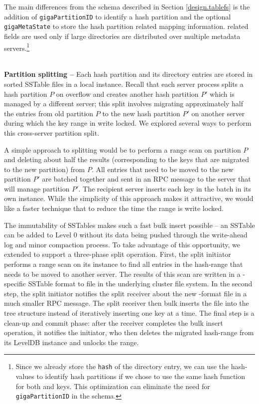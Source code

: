 The main differences from the \ldb{} schema described in Section
\ref{design.tablefs} is the addition of \texttt{gigaPartitionID} to identify a
\giga{} hash partition and the optional \texttt{gigaMetaState} to store the
hash partition related mapping information. \giga{} related fields are used
only if large directories are distributed over multiple metadata servers.\footnote{
Since we already store the \texttt{hash} of the directory entry, we can use the
hash-values to identify hash partitions if we chose to use the same hash
function for both \giga and \ldb keys. This optimization can eliminate the
need for \texttt{gigaPartitionID} in the schema.} 

~\\
\textbf{Partition splitting -- }
Each \giga{} hash partition and its directory entries are stored in sorted
SSTable files in a local \ldb{} instance. 
Recall that each \giga{} server process splits a hash partition $P$ on 
overflow and creates another hash partition $P'$ which is managed by a 
different server; this split involves migrating approximately half the entries 
from old partition $P$ to the new hash partition $P'$ on another server during
which the key range in write locked.
We explored several ways to perform this cross-server partition split.

A simple approach to splitting would be to perform a \ldb range scan on 
partition $P$ and deleting about half the results (corresponding to the keys
that are migrated to the new partition) from $P$. 
All entries that need to be moved to the new partition $P'$ are batched
together and sent in an RPC message to the server that will manage partition 
$P'$.
The recipient server inserts each key in the batch in its own \ldb{}
instance. While the simplicity of this approach makes it attractive, we would
like a faster technique that to reduce the time the range is write locked. 

The immutability of \ldb SSTables makes such a fast bulk insert possible -- an
SSTable can be added to Level 0 without its data being pushed through the
write-ahead log and minor compaction process.
To take advantage of this opportunity, we extended \ldb{}
to support a three-phase split operation. 
First, the split initiator performs a range scan on its \ldb{} instance to find all
entries in the hash-range that needs to be moved to another server. The results
of this scan are written in a \ldb{}-specific SSTable format to file in the
underlying cluster file system. 
In the second step, the split initiator notifies the split receiver about
the new \ldb{}-format file in a much smaller RPC message.
The split receiver then bulk inserts the file into the \ldb{} tree structure 
instead of iteratively inserting one key at a time.
The final step is a clean-up and commit phase: after the receiver completes the 
bulk insert operation, it notifies the 
initiator, who then deletes the migrated hash-range from its LevelDB instance
and unlocks the range.%

